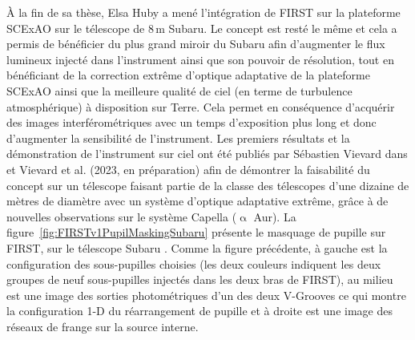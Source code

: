 À la fin de sa thèse, Elsa Huby a mené l'intégration de \ac{FIRST} sur la plateforme \ac{SCExAO} sur le télescope de $8 \,$m Subaru. Le concept est resté le même et cela a permis de bénéficier du plus grand miroir du Subaru afin d'augmenter le flux lumineux injecté dans l'instrument ainsi que son pouvoir de résolution, tout en bénéficiant de la correction extrême d'optique adaptative de la plateforme \ac{SCExAO} ainsi que la meilleure qualité de ciel (en terme de turbulence atmosphérique) à disposition sur Terre. Cela permet en conséquence d'acquérir des images interférométriques avec un temps d'exposition plus long et donc d'augmenter la sensibilité de l'instrument. Les premiers résultats et la démonstration de l'instrument sur ciel ont été publiés par Sébastien Vievard dans \cite{vievard2020a} et Vievard et al. (2023, en préparation) afin de démontrer la faisabilité du concept sur un télescope faisant partie de la classe des télescopes d'une dizaine de mètres de diamètre avec un système d'optique adaptative extrême, grâce à de nouvelles observations sur le système Capella ($\upalpha$ Aur). La figure~\ref{fig:FIRSTv1PupilMaskingSubaru} présente le masquage de pupille sur \ac{FIRST}, sur le télescope Subaru \citep{vievard2020a}. Comme la figure précédente, à gauche est la configuration des sous-pupilles choisies (les deux couleurs indiquent les deux groupes de neuf sous-pupilles injectés dans les deux bras de \ac{FIRST}), au milieu est une image des sorties photométriques d'un des deux V-Grooves ce qui montre la configuration 1-D du réarrangement de pupille et à droite est une image des réseaux de frange sur la source interne.

